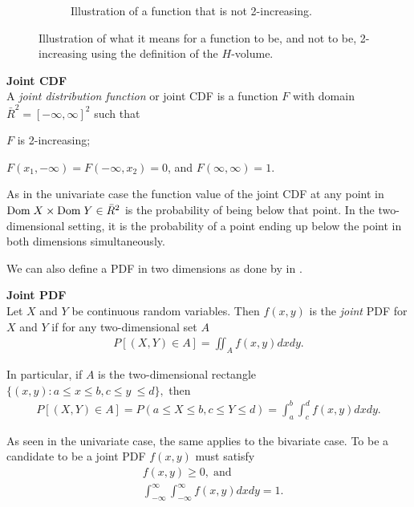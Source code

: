 \begin{figure}[h]
\begin{subfigure}[t]{0.45\linewidth}
        \caption{Illustration of a function that is not 2-increasing.}
    \end{subfigure}
    \caption{Illustration of what it means for a function to be, and not to be, 2-increasing using the definition of the $H$-volume.}
    \label{fig:2-Increasing}
\end{figure}


\begin{definition}\label{def:JointCDF} \textbf{Joint CDF} \\
    A \emph{joint distribution function} or joint \gls{CDF} is a function $F$ with domain $\bar{R}^2 = [-\infty, \infty]^2$ such that 
    \begin{compactenum}
        \item $F$ is 2-increasing; 
        \item $F(x_1,-\infty)= F(-\infty, x_2) = 0$, and $F(\infty,\infty)=1$.
    \end{compactenum}
\end{definition}

As in the univariate case the function value of the joint \gls{CDF} at any point in $\mathrm{Dom \;} X\times \mathrm{Dom \;} Y \in\bar{R}^2$ is the probability of being below that point. In the two-dimensional setting, it is the probability of a point ending up below the point in both dimensions simultaneously. 

We can also define a \gls{PDF} in two dimensions as done by  in .

\begin{definition}\label{def:JointPDF} \textbf{Joint PDF}\\
    Let $X$ and $Y$ be continuous random variables. Then $f(x, y)$ is the \emph{joint} \gls{PDF} for $X$ and $Y$ if for any two-dimensional set $A$ 
    \begin{align*}
        P[(X,Y) \in A] =  \iint_A f(x,y)dxdy.
    \end{align*}
    
    In particular, if $A$ is the two-dimensional rectangle $\{(x,y) : a\leq x \leq b, c\leq y \ \leq d\}, $ then
    \begin{align*}
        P[(X,Y) \in A] = P(a\leq X \leq b, c \leq Y \leq d) =\int_a^b\!\!\!\int_c^d f(x,y)dxdy.
    \end{align*}
\end{definition}

\begin{remark}
    As seen in the univariate case, the same applies to the bivariate case. To be a candidate to be a joint \gls{PDF} $f(x,y)$ must satisfy 
    \begin{align*}
        &f(x,y) \geq 0, \;\mathrm{and} \\
        &\int_{-\infty}^{\infty}\!\int_{-\infty}^{\infty}f(x,y)dxdy=1.
    \end{align*}    
\end{remark}


